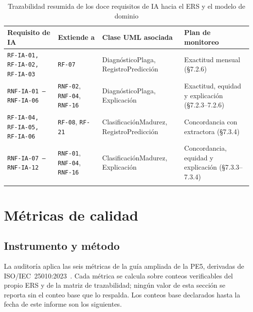 \documentclass[11pt,a4paper]{article}
\newcommand{\id}[1]{\texttt{#1}}
\begin{document}
\begin{longtable}{|C{2.1cm}|C{2.0cm}|L{4.3cm}|L{4.0cm}|}
\hline
{}\textbf{Requisito de IA} & \textbf{Extiende a} & \textbf{Clase UML asociada} & \textbf{Plan de monitoreo} \\
\hline
\endhead
\id{RF-IA-01, RF-IA-02, RF-IA-03} & \id{RF-07} & DiagnósticoPlaga, RegistroPredicción &
Exactitud mensual (\S 7.2.6) \\ \hline
\id{RNF-IA-01 -- RNF-IA-06} & \id{RNF-02}, \id{RNF-04}, \id{RNF-16} & DiagnósticoPlaga, Explicación
& Exactitud, equidad y explicación (\S 7.2.3--7.2.6) \\ \hline
\id{RF-IA-04, RF-IA-05, RF-IA-06} & \id{RF-08}, \id{RF-21} & ClasificaciónMadurez,
RegistroPredicción & Concordancia con extractora (\S 7.3.4) \\ \hline
\id{RNF-IA-07 -- RNF-IA-12} & \id{RNF-01}, \id{RNF-04}, \id{RNF-16} & ClasificaciónMadurez,
Explicación & Concordancia, equidad y explicación (\S 7.3.3--7.3.4) \\ \hline
\caption{Trazabilidad resumida de los doce requisitos de IA hacia el ERS y el modelo de dominio}
\label{tab:traza-ia}
\end{longtable}

\section{Métricas de calidad}
\label{sec:metricas}

\subsection{Instrumento y método}

La auditoría aplica las seis métricas de la guía ampliada de la PE5, derivadas de
ISO/IEC~25010:2023~\cite{iso25010}. Cada métrica se calcula sobre conteos verificables del propio
ERS y de la matriz de trazabilidad; ningún valor de esta sección se reporta sin el conteo base que
lo respalda. Los conteos base declarados hasta la fecha de este informe son los siguientes.
\end{document}
